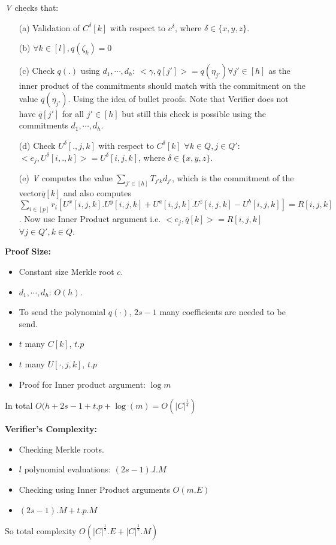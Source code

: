 $\textit{V}$ checks that:
\begin{itemize}
	\item[(a)] Validation of $C^{\delta}[k]$ with respect to $c^{\delta}$, where $\delta\in\{x,y,z\}$. 
	\item[(b)] $\forall k\in[l], q(\zeta_k)=0$
	\item[(c)] Check $q(.)$ using $d_1,\cdots,d_h$: $<\gamma,\overline{q}[j']>=q(\eta_{j'})\forall j'\in[h]$ as the inner product of the commitments should match with the commitment on the value $q(\eta_{j'})$. Using the idea of bullet proofs. Note that Verifier does not have $\overline{q}[j'] $ for all $j'\in[h]$ but still this check is possible using the commitments $d_1,\cdots, d_h$.
	\item[(d)] Check $U^{\delta}[.,j,k]$ with respect to $C^{\delta}[k]$ $\forall k\in Q,  j\in Q'$: $<e_j,U^{\delta}[i,.,k]>=U^{\delta}[i,j,k]$, where $\delta\in\{x,y,z\}$. 
	\item[(e)] $\textit{V}$ computes the value $\sum\limits_{j'\in[h]}T_{j'k}d_{j'}$, which is the commitment of the vector$\overline{q}[k]$ and also computes$\sum\limits_{i\in[p]} r_i[U^{x}[i,j,k].U^y[i,j,k]+U^{a}[i,j,k].U^z[i,j,k]-U^{b}[i,j,k]] =R[i,j,k]$. Now use Inner Product argument i.e. $<e_j,\overline{q}[k]>=R[i,j,k]$ $\forall j\in Q', k\in Q$.\\
\end{itemize}

\textbf{Proof Size:}
\begin{itemize}
	\item Constant size Merkle root $c$.
	\item $d_1,\cdots, d_h$: $O(h)$.
	\item To send the polynomial $q(\cdot)$, $2s-1$ many coefficients are needed to be send.
	\item $t$ many $C[k]$, $t.p$
	\item $t$ many $U[\cdot,j,k]$, $t.p$
	\item Proof for Inner product argument: $\log m$
\end{itemize}
In total $O(h+2s-1+t.p+\log(m) = O(|C|^{\frac{1}{4}})$

\textbf{Verifier's Complexity:}
\begin{itemize}
	\item Checking Merkle roots.
	\item $l$ polynomial evaluations: $(2s-1).l.M$
	\item Checking using Inner Product arguments $O(m.E)$
	\item $(2s-1).M+t.p.M$
\end{itemize}
So total complexity $O(|C|^{\frac{1}{2}}. E + |C|^{\frac{1}{2}}. M)$

